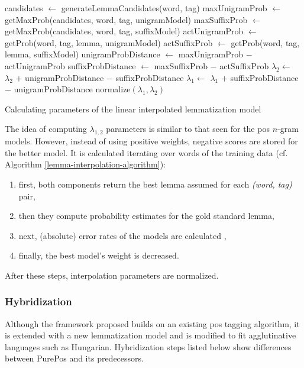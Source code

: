 \begin{algorithm*}[h]
\begin{algorithmic}[1]
        \State candidates $\gets$ generateLemmaCandidates(word, tag)
        \State maxUnigramProb $\gets$ getMaxProb(candidates, word, tag, unigramModel)
        \State maxSuffixProb $\gets$ getMaxProb(candidates, word, tag, suffixModel)
        \State actUnigramProb $\gets$ getProb(word, tag, lemma, unigramModel)
        \State actSuffixProb $\gets$ getProb(word, tag, lemma, suffixModel)
        \State unigramProbDistance $\gets$ maxUnigramProb $-$ actUnigramProb
        \State suffixProbDistance $\gets$ maxSuffixProb $-$ actSuffixProb
            \State $\lambda_{2} \gets$ $\lambda_{2}$ $+$ unigramProbDistance $-$ suffixProbDistance
        \Else%
            \State $\lambda_{1} \gets$ $\lambda_{1}$ $+$ suffixProbDistance $-$ unigramProbDistance
        \EndIf
    \EndFor
    \State normalize$( \lambda_{1}, \lambda_{2} )$
  \end{algorithmic}
  \caption{Calculating parameters of the linear interpolated lemmatization model}
\label{lemma-interpolation-algorithm}
\end{algorithm*}

The idea of computing $\lambda_{1,2}$ parameters is similar to that seen for the \gls{pos} $n$-gram models. 
However, instead of using positive weights, negative scores are stored for the better model.  
It is calculated iterating over words of the training data (cf. Algorithm \ref{lemma-interpolation-algorithm}):
\begin{enumerate}
  \item first, both components return the best lemma assumed for each \emph{(word, tag)} pair, 
  \item then they compute probability estimates for the gold standard lemma,
  \item next, (absolute) error rates of the models are calculated ,
  \item finally, the best model’s weight is decreased.
\end{enumerate}
After these steps, interpolation parameters are normalized.


\subsubsection{Hybridization}

Although the framework proposed builds on an existing \gls{pos} tagging algorithm, it is extended with a new lemmatization model and is modified to fit agglutinative languages such as Hungarian. 
Hybridization steps listed below show differences between PurePos and its predecessors.

